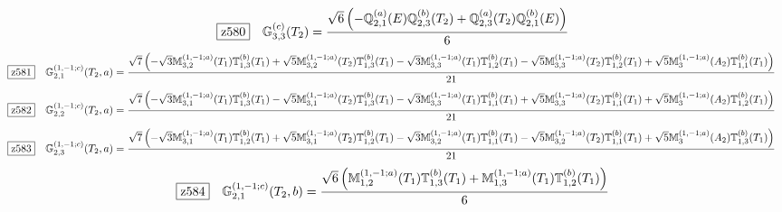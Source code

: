 \documentclass[fleqn,10pt,landscape]{jsarticle}
\begin{document}
\begin{dmath*}
\hspace*{3mm}\fbox{z580}\quad \mathbb{G}_{3,3}^{(c)}(T_{2})=\frac{\sqrt{6} \left(- \mathbb{Q}_{2,1}^{(a)}(E) \mathbb{Q}_{2,3}^{(b)}(T_{2}) + \mathbb{Q}_{2,3}^{(a)}(T_{2}) \mathbb{Q}_{2,1}^{(b)}(E)\right)}{6}
\end{dmath*}
\begin{dmath*}
\hspace*{3mm}\fbox{z581}\quad \mathbb{G}_{2,1}^{(1,-1;c)}(T_{2},a)=\frac{\sqrt{7} \left(- \sqrt{3} \mathbb{M}_{3,2}^{(1,-1;a)}(T_{1}) \mathbb{T}_{1,3}^{(b)}(T_{1}) + \sqrt{5} \mathbb{M}_{3,2}^{(1,-1;a)}(T_{2}) \mathbb{T}_{1,3}^{(b)}(T_{1}) - \sqrt{3} \mathbb{M}_{3,3}^{(1,-1;a)}(T_{1}) \mathbb{T}_{1,2}^{(b)}(T_{1}) - \sqrt{5} \mathbb{M}_{3,3}^{(1,-1;a)}(T_{2}) \mathbb{T}_{1,2}^{(b)}(T_{1}) + \sqrt{5} \mathbb{M}_{3}^{(1,-1;a)}(A_{2}) \mathbb{T}_{1,1}^{(b)}(T_{1})\right)}{21}
\end{dmath*}
\begin{dmath*}
\hspace*{3mm}\fbox{z582}\quad \mathbb{G}_{2,2}^{(1,-1;c)}(T_{2},a)=\frac{\sqrt{7} \left(- \sqrt{3} \mathbb{M}_{3,1}^{(1,-1;a)}(T_{1}) \mathbb{T}_{1,3}^{(b)}(T_{1}) - \sqrt{5} \mathbb{M}_{3,1}^{(1,-1;a)}(T_{2}) \mathbb{T}_{1,3}^{(b)}(T_{1}) - \sqrt{3} \mathbb{M}_{3,3}^{(1,-1;a)}(T_{1}) \mathbb{T}_{1,1}^{(b)}(T_{1}) + \sqrt{5} \mathbb{M}_{3,3}^{(1,-1;a)}(T_{2}) \mathbb{T}_{1,1}^{(b)}(T_{1}) + \sqrt{5} \mathbb{M}_{3}^{(1,-1;a)}(A_{2}) \mathbb{T}_{1,2}^{(b)}(T_{1})\right)}{21}
\end{dmath*}
\begin{dmath*}
\hspace*{3mm}\fbox{z583}\quad \mathbb{G}_{2,3}^{(1,-1;c)}(T_{2},a)=\frac{\sqrt{7} \left(- \sqrt{3} \mathbb{M}_{3,1}^{(1,-1;a)}(T_{1}) \mathbb{T}_{1,2}^{(b)}(T_{1}) + \sqrt{5} \mathbb{M}_{3,1}^{(1,-1;a)}(T_{2}) \mathbb{T}_{1,2}^{(b)}(T_{1}) - \sqrt{3} \mathbb{M}_{3,2}^{(1,-1;a)}(T_{1}) \mathbb{T}_{1,1}^{(b)}(T_{1}) - \sqrt{5} \mathbb{M}_{3,2}^{(1,-1;a)}(T_{2}) \mathbb{T}_{1,1}^{(b)}(T_{1}) + \sqrt{5} \mathbb{M}_{3}^{(1,-1;a)}(A_{2}) \mathbb{T}_{1,3}^{(b)}(T_{1})\right)}{21}
\end{dmath*}
\begin{dmath*}
\hspace*{3mm}\fbox{z584}\quad \mathbb{G}_{2,1}^{(1,-1;c)}(T_{2},b)=\frac{\sqrt{6} \left(\mathbb{M}_{1,2}^{(1,-1;a)}(T_{1}) \mathbb{T}_{1,3}^{(b)}(T_{1}) + \mathbb{M}_{1,3}^{(1,-1;a)}(T_{1}) \mathbb{T}_{1,2}^{(b)}(T_{1})\right)}{6}
\end{dmath*}
\end{document}
